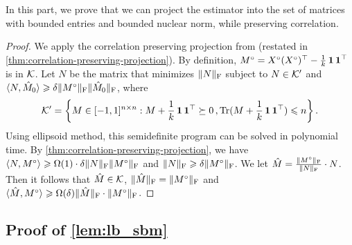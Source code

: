 In this part, we prove that we can project the estimator into the set of matrices with bounded entries and bounded nuclear norm, while preserving correlation.
\begin{proof}
    We apply the correlation preserving projection from \cite{Hopkins17} (restated in \cref{thm:correlation-preserving-projection}).
    By definition, $M^{\circ} = X^{\circ} (X^{\circ})^{\top} - \frac{1}{k} \operatorname{\mathbf 1} \operatorname{\mathbf 1}^{\top}$ is in $\mathcal K$.
    Let $N$ be the matrix that minimizes $\lVert N\rVert_{\mathrm{F}}$ subject to $N\in \mathcal K^\prime$ and $\langle N,\hat{M}_0\rangle\geqslant \delta \lVert M^{\circ}\rVert_{\mathrm{F}} \lVert\hat{M}_0\rVert_{\mathrm{F}}$, where
    \begin{equation*}
    \cK^\prime=\Set{M\in [-1,1]^{n\times n}: M+\frac{1}{k} \Ind \Ind^{\top} \succeq 0 \,, \Tr(M + \frac{1}{k} \Ind \Ind^{\top}) \leq n} \,.
    \end{equation*}
    Using ellipsoid method, this semidefinite program can be solved in polynomial time.
    By \cref{thm:correlation-preserving-projection}, we have $\langle N,M^{\circ}\rangle\geqslant \Omega(1)\cdot \delta\lVert N\rVert_{\mathrm{F}} \lVert M^{\circ}\rVert_{\mathrm{F}}$ and $\lVert N\rVert_{\mathrm{F}} \geqslant \delta\lVert M^{\circ}\rVert_{\mathrm{F}}$.
    We let $\hat{M}=\frac{\lVert M^\circ\rVert_{\mathrm{F}}}{\lVert N\rVert_{\mathrm{F}}}\cdot N$.
    Then it follows that $\hat{M}\in \mathcal K$, $\lVert\hat{M}\rVert_{\mathrm{F}}=\lVert M^\circ\rVert_{\mathrm{F}}$ and $\langle\hat{M},M^{\circ}\rangle\geqslant \Omega(\delta) \lVert\hat{M}\rVert_{\mathrm{F}}\cdot \lVert M^\circ\rVert_{\mathrm{F}}$.
\end{proof}

\subsection{Proof of \cref{lem:lb_sbm}}

